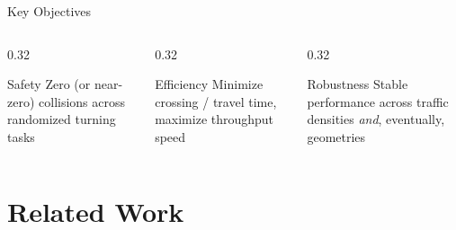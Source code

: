 \documentclass[aspectratio=169,10pt]{beamer}
\begin{document}
\begin{frame}{Key Objectives}
    \begin{columns}
        \begin{column}{0.32\textwidth}
            \begin{block}{Safety}
                \centering
                Zero (or near-zero) collisions across randomized turning tasks
            \end{block}
        \end{column}
        \begin{column}{0.32\textwidth}
            \begin{block}{Efficiency}
                \centering
                Minimize crossing / travel time, maximize throughput speed
            \end{block}
        \end{column}
        \begin{column}{0.32\textwidth}
            \begin{block}{Robustness}
                \centering
                Stable performance across traffic densities \emph{and}, eventually, geometries
            \end{block}
        \end{column}
    \end{columns}
\end{frame}

\section{Related Work}
\end{document}
